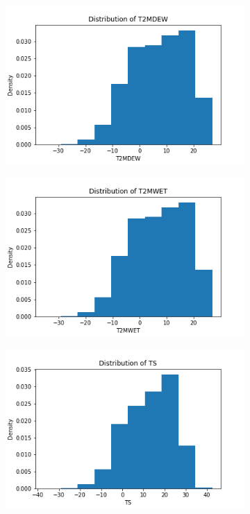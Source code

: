 \documentclass{article}
\begin{document}
\begin{itemize}
\begin{figure}[htbp]
\begin{subfigure}{0.3\textwidth}
                \includegraphics[width=\linewidth]{pic/hist/Distribution T2MDEW .png}
            \end{subfigure}
            \begin{subfigure}{0.3\textwidth}
                \centering
                \includegraphics[width=\linewidth]{pic/hist/Distribution T2MWET .png}
            \end{subfigure}
            \begin{subfigure}{0.3\textwidth}
                \centering
                \includegraphics[width=\linewidth]{pic/hist/Distribution TS .png}

\end{subfigure}
\end{figure}
\end{itemize}
\end{document}
